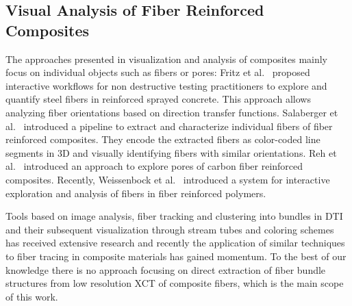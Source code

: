 \subsection {Visual Analysis of Fiber Reinforced Composites}
The approaches presented in visualization and analysis of composites mainly focus on individual objects such as fibers or pores: Fritz et al.~\cite{Fritz2009} proposed interactive workflows for non destructive testing practitioners to explore and quantify steel fibers in reinforced sprayed concrete. This approach allows analyzing fiber orientations based on direction transfer functions. Salaberger et al.~\cite{Salaberger2011} introduced a pipeline to extract and characterize individual fibers of fiber reinforced composites. They encode the extracted fibers as color-coded line segments in 3D and visually identifying fibers with similar orientations. Reh et al.~\cite{PMI_AR_2012} introduced an approach to explore pores of carbon fiber reinforced composites. Recently, Weissenbock et al.~\cite{Weissenbock2014} introduced a system for interactive exploration and analysis of fibers in fiber reinforced polymers. 

Tools based on image analysis, fiber tracking and clustering into bundles in DTI and their subsequent visualization through stream tubes and coloring schemes has received extensive research and recently the application of similar techniques to fiber tracing in composite materials has gained momentum. To the best of our knowledge there is no approach focusing on direct extraction of fiber bundle structures from low resolution XCT of composite fibers, which is the main scope of this work.



